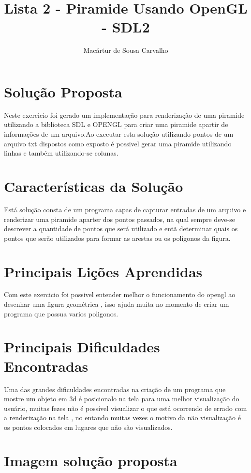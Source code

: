 \documentclass[12pt]{article}
\begin{document}
\title{Lista 2 - Piramide Usando OpenGL - SDL2}
\author{Mac\'artur de Sousa Carvalho}
\maketitle

\section{Solu\c{c}\~ao Proposta}
	Neste exercicio foi gerado um implementa\c{c}\~ao para renderiza\c{c}\~ao de uma piramide utilizando a biblioteca SDL e OPENGL para criar uma piramide apartir de informa\c{c}\~oes de um arquivo.Ao executar esta solu\c{c}\~ao utilizando pontos de um arquivo txt dispostos como exposto \'e possivel gerar uma piramide utilizando linhas e tamb\'em utilizando-se colunas.

\section{Caracter\'isticas da Solu\c{c}\~ao}
	Est\'a solu\c{c}\~ao consta de um programa capas de capturar entradas de um arquivo e renderizar uma piramide aparter dos pontos passados, na qual sempre deve-se descrever a quantidade de pontos que ser\'a utilizado e ent\~a determinar quais os pontos que ser\~ao utilizados para formar as arestas ou os poligonos da figura.

\section{Principais Li\c{c}\~oes Aprendidas}
	Com este exercicio foi possivel entender melhor o funcionamento do opengl ao desenhar uma figura geom\'etrica , isso ajuda muita no momento de criar um programa que possua varios poligonos.

\section{Principais Dificuldades Encontradas}
	Uma das grandes dificuldades encontradas na cria\c{c}\~ao de um programa que mostre um objeto em 3d \'e posicionalo na tela para uma melhor visualiza\c{c}\~ao do usu\'ario, muitas fezes não \'e poss\'ivel visualizar o que est\'a ocorrendo de errado com a renderiza\c{c}\~ao na tela , no entando  muitas vezes o motivo da não visualiza\c{c}\~ao é os pontos colocados em lugares que n\~ao s\~ao visualizados.


\section{Imagem solu\c{c}\~ao proposta}
\end{document}
